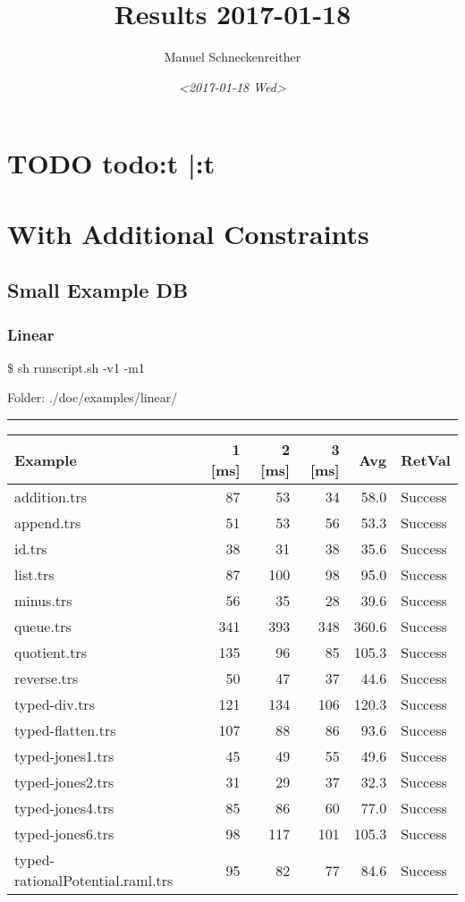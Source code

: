 \documentclass[11pt]{article}
\author{Manuel Schneckenreither}
\date{\textit{<2017-01-18 Wed>}}
\title{Results 2017-01-18}
\begin{document}
\maketitle
\section{{\bfseries\sffamily TODO} todo:t |:t}
\label{sec:orgaba32bd}


\section{With Additional Constraints}
\label{sec:orgae34c2e}

\subsection{Small Example DB}
\label{sec:orga6b3083}

\subsubsection{Linear}
\label{sec:org7af6f6b}

\$ sh runscript.sh -v1 -m1

Folder: ./doc/examples/linear/

\rule{\linewidth}{0.5pt}

\begin{center}
\begin{tabular}{lrrrrl}
\hline
Example & 1 [ms] & 2 [ms] & 3 [ms] & Avg & RetVal\\
\hline
addition.trs & 87 & 53 & 34 & 58.0 & Success\\
append.trs & 51 & 53 & 56 & 53.3 & Success\\
id.trs & 38 & 31 & 38 & 35.6 & Success\\
list.trs & 87 & 100 & 98 & 95.0 & Success\\
minus.trs & 56 & 35 & 28 & 39.6 & Success\\
queue.trs & 341 & 393 & 348 & 360.6 & Success\\
quotient.trs & 135 & 96 & 85 & 105.3 & Success\\
reverse.trs & 50 & 47 & 37 & 44.6 & Success\\
typed-div.trs & 121 & 134 & 106 & 120.3 & Success\\
typed-flatten.trs & 107 & 88 & 86 & 93.6 & Success\\
typed-jones1.trs & 45 & 49 & 55 & 49.6 & Success\\
typed-jones2.trs & 31 & 29 & 37 & 32.3 & Success\\
typed-jones4.trs & 85 & 86 & 60 & 77.0 & Success\\
typed-jones6.trs & 98 & 117 & 101 & 105.3 & Success\\
typed-rationalPotential.raml.trs & 95 & 82 & 77 & 84.6 & Success\\
\hline
\end{tabular}

\end{center}
\end{document}
